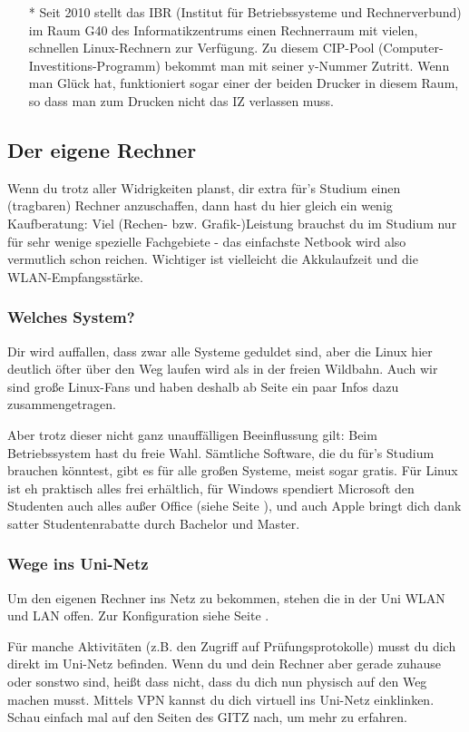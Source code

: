 \begin{multicols}{2}
\begin{itemize}
				\item[*] Seit 2010 stellt das IBR (Institut für Betriebssysteme und Rechnerverbund) im Raum G40 des Informatikzentrums einen Rechnerraum mit vielen, schnellen Linux-Rechnern  zur Verfügung. Zu diesem CIP-Pool (Computer-Investitions-Programm) bekommt man mit seiner y-Nummer Zutritt. Wenn man Glück hat, funktioniert sogar einer der beiden Drucker in diesem Raum, so dass man zum Drucken nicht das IZ verlassen muss.
			\end{itemize}

		\subsection{Der eigene Rechner}
			Wenn du trotz aller Widrigkeiten planst, dir extra für's Studium einen (tragbaren) Rechner anzuschaffen, dann hast du hier gleich ein wenig  Kaufberatung: Viel (Rechen- bzw. Grafik-)Leistung brauchst du im Studium  nur für sehr wenige spezielle Fachgebiete - das einfachste Netbook wird also vermutlich schon reichen. Wichtiger ist vielleicht die Akkulaufzeit und die WLAN-Empfangsstärke.

		\subsubsection{Welches System?}
			Dir wird auffallen, dass zwar alle Systeme geduldet sind, aber die Linux hier deutlich öfter über den Weg laufen wird als in der freien Wildbahn. Auch wir sind große Linux-Fans und haben deshalb ab Seite \pageref{linux} ein paar Infos dazu zusammengetragen.

			Aber trotz dieser nicht ganz unauffälligen Beeinflussung gilt: Beim Betriebssystem hast du freie Wahl. Sämtliche Software, die du für's Studium brauchen  könntest, gibt es für alle großen Systeme, meist sogar gratis. Für Linux ist eh  praktisch alles frei erhältlich, für Windows spendiert Microsoft den Studenten auch alles außer Office (siehe Seite \pageref{msdnaa}), und auch Apple bringt dich dank satter Studentenrabatte durch Bachelor und Master. 

		\subsubsection{Wege ins Uni-Netz}
			Um den eigenen Rechner ins Netz zu bekommen, stehen die in der Uni WLAN und LAN offen. Zur Konfiguration siehe Seite \pageref{wlan}.

			Für manche Aktivitäten (z.B. den Zugriff auf Prüfungsprotokolle) musst du dich direkt im Uni-Netz befinden. Wenn du und dein Rechner aber gerade zuhause oder sonstwo sind, heißt dass nicht, dass du dich nun physisch auf den Weg machen musst. Mittels VPN kannst du dich virtuell ins Uni-Netz einklinken. Schau einfach mal auf den Seiten des GITZ nach, um mehr zu erfahren.
\end{multicols}